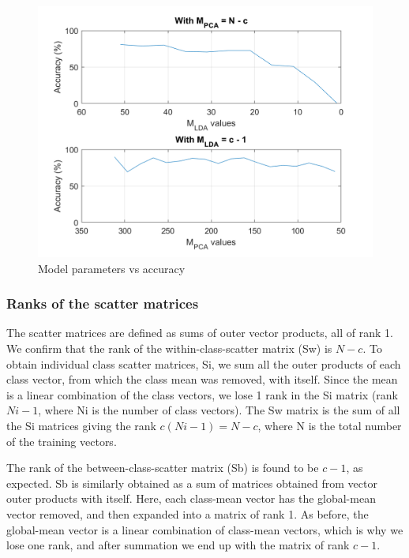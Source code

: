 \documentclass[10pt,technote]{IEEEtran}
\begin{document}
\begin{figure}
    \centering
    \includegraphics[width = \linewidth]{../results/ex2LDA/accuracy_vs_Ms.png}
    \caption{Model parameters vs accuracy}
    \label{fig:mod_params_vs_acc}
\end{figure}

\subsubsection{Ranks of the scatter matrices}
The scatter matrices are defined as sums of outer vector products, all of rank 1.
We confirm that the rank of the within-class-scatter matrix (Sw) is $N - c$. To obtain individual class scatter matrices, Si, we sum all the outer products of each class vector, from which the class mean was removed, with itself. Since the mean is a linear combination of the class vectors, we lose 1 rank in the Si matrix (rank $Ni - 1$, where Ni is the number of class vectors). The Sw matrix is the sum of all the Si matrices giving the rank $c(Ni - 1) = N - c$, where N is the total number of the training vectors.

The rank of the between-class-scatter matrix (Sb) is found to be $c - 1$, as expected. Sb is similarly obtained as a sum of matrices obtained from vector outer products with itself. Here, each class-mean vector has the global-mean vector removed, and then expanded into a matrix of rank 1. As before, the global-mean vector is a linear combination of class-mean vectors, which is why we lose one rank, and after summation we end up with the matrix of rank $c - 1$.
\end{document}
